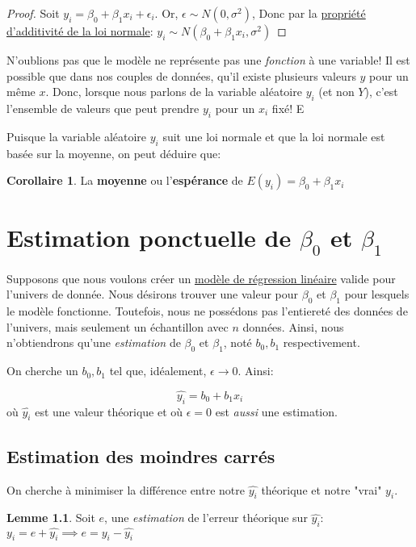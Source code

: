 \documentclass[12pt]{book}
\theoremstyle{definition}
\newtheorem{corollary}{Corollaire}[theorem]
\newtheorem{lemma}[theorem]{Lemme}
\begin{document}
\begin{proof}
    Soit $y_i = \beta_0 + \beta_1x_i + \epsilon_i$. Or, $\epsilon \sim N(0, \sigma^2)$,
    Donc par la \hyperref[def:loi_normale_additivite]{propriété d'additivité de la loi normale}: $y_i \sim N(\beta_0 + \beta_1x_i, \sigma^2)$
\end{proof}

N'oublions pas que le modèle ne représente pas une \textit{fonction} à une variable! Il est possible que dans nos couples de données, qu'il existe 
plusieurs valeurs $y$ pour un même $x$. Donc, lorsque nous parlons de la variable aléatoire $y_i$ (et non $Y$), c'est l'ensemble de valeurs que peut 
prendre $y_i$ pour un $x_i$ fixé! E

Puisque la variable aléatoire $y_i$ suit une loi normale et que la loi normale est basée sur la moyenne, on peut déduire que:
\begin{corollary}
    \label{def:y_moyenne}
    La \textbf{moyenne} ou l'\textbf{espérance} de $E(y_i) = \beta_0 + \beta_1x_i$
\end{corollary}


\chapter{Estimation ponctuelle de $\beta_0$ et $\beta_1$}
Supposons que nous voulons créer un \hyperref[def:regression_lineaire]{modèle de régression linéaire} valide pour l'univers de donnée.
Nous désirons trouver une valeur pour $\beta_0$ et $\beta_1$ pour lesquels le modèle fonctionne. Toutefois, nous ne possédons pas 
l'entiereté des données de l'univers, mais seulement un échantillon avec $n$ données. Ainsi, nous n'obtiendrons qu'une \textit{estimation}
de $\beta_0$ et  $\beta_1$, noté $b_0, b_1$ respectivement.

On cherche un $b_0, b_1$ tel que, idéalement, $\epsilon \to 0$. Ainsi:

$$ \hat{y_i} = b_0 + b_1x_i$$ où $\hat{y_i}$ est une valeur théorique et où $\epsilon = 0$ est \textit{aussi} une estimation.

\section{Estimation des moindres carrés}
On cherche à minimiser la différence entre notre $\hat{y_i}$ théorique et notre "vrai" $y_i$.
\begin{lemma}
    \label{lem:estimation_erreur}
    Soit $e$, une \textit{estimation } de l'erreur théorique sur $\hat{y_i}$:
    $y_i = e + \hat{y_i} \implies e = y_i - \hat{y_i}$
\end{lemma}
\end{document}
